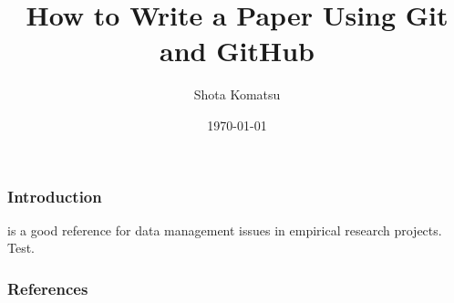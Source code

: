 \documentclass{beamer}
\title{How to Write a Paper Using Git and GitHub}
\author{Shota Komatsu}
\date{\today}
\begin{document}
\frame{\titlepage}

\begin{frame}
\frametitle{Introduction}
\citet{knittel2018working} is a good reference for data management issues in empirical research projects. Test.
\end{frame}

\begin{frame}
\frametitle{References}


    

\end{frame}
\end{document}
